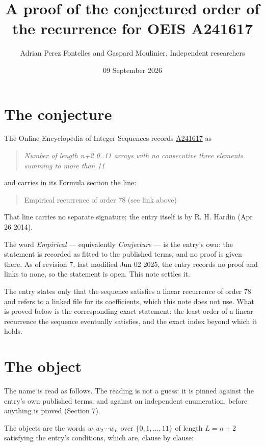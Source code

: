 \documentclass[11pt]{article}
\title{A proof of the conjectured order of the recurrence for OEIS A241617}
\author{Adrian Perez Fontelles and Gaspard Moulinier, Independent researchers}
\date{09 September 2026}
\theoremstyle{definition}
\begin{document}
\maketitle
\section{The conjecture}

The Online Encyclopedia of Integer Sequences records \href{https://oeis.org/A241617}{A241617} as

\begin{quote}\itshape Number of length n+2 0..11 arrays with no consecutive three elements summing to more than 11\end{quote}

and carries in its Formula section the line:

\begin{quote}\ttfamily Empirical recurrence of order 78 (see link above)\end{quote}

That line carries no separate signature; the entry itself is by R. H. Hardin (Apr 26 2014).

The word {\itshape Empirical} --- equivalently {\itshape Conjecture} --- is the entry's own: the statement is recorded as fitted to the published terms, and no proof is given there. As of revision 7, last modified Jun 02 2025, the entry records no proof and links to none, so the statement is open. This note settles it.

The entry states only that the sequence satisfies a linear recurrence of order $78$ and refers to a linked file for its coefficients, which this note does not use. What is proved below is the corresponding exact statement: the least order of a linear recurrence the sequence eventually satisfies, and the exact index beyond which it holds.

\section{The object}

The name is read as follows. The reading is not a guess: it is pinned against the entry's own published terms, and against an independent enumeration, before anything is proved (Section 7).

The objects are the words $w_1 w_2 \cdots w_L$ over $\{0,1,\dots,11\}$ of length $L = n + 2$ satisfying the entry's conditions, which are, clause by clause:
\end{document}
